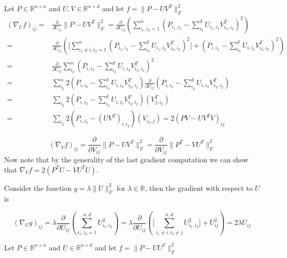 \documentclass{report}
\begin{document}
   Let $ P \in \mathbb{R}^{n \times n} $ and $ U, V \in \mathbb{R}^{n \times d} $ and let $ f = \|P - UV^T\|_F^2 $
   \begin{align*}
     (\nabla_U f)_{ij} =& \frac{\partial}{\partial U_{ij}}\|P - UV^T\|_F^2 = 
     \frac{\partial}{\partial U_{ij}} (\displaystyle \sum_{i_1,i_2 =1}^n(P_{i_1,i_2} 
                     - \displaystyle\sum_{i_3}^d U_{i_1,i_3}V^T_{i_3,i_2})^2)  \\
       =& \frac{\partial}{\partial U_{ij}} (\lbrack \displaystyle \sum_{i_1 \neq i,i_2 =1}^n(P_{i_1,i_2} 
       - \displaystyle\sum_{i_3}^d U_{i_1,i_3}V^T_{i_3,i_2})^2 \rbrack + (P_{i,i_2} 
       - \displaystyle\sum_{i_3}^d U_{i,i_3}V^T_{i_3,i_2})^2)\\
       =& \frac{\partial}{\partial U_{ij}}\displaystyle\sum_{i_2}^n(P_{i,i_2} 
       - \displaystyle\sum_{i_3}^d U_{i,i_3}V^T_{i_3,i_2})^2 \\
       =& \displaystyle\sum_{i_2}^n2(P_{i,i_2} 
       - \displaystyle\sum_{i_3}^d U_{i,i_3}V^T_{i_3,i_2})\frac{\partial}{\partial U_{ij}}(P_{i,i_2} 
       - \displaystyle\sum_{i_3}^d U_{i,i_3}V^T_{i_3,i_2}) \\
       =& \displaystyle\sum_{i_2} 2(P_{i,i_2} 
       - \displaystyle\sum_{i_3}^d U_{i,i_3}V^T_{i_3,i_2})(V^T_{j,i_2}) \\
       =& \displaystyle\sum_{i_2} 2(P_{i,i_2} 
       - (UV^T)_{i,i_2})(V_{i_2,j}) = 2(PV - UV^TV)_{ij}
   \end{align*}
 
  \[
    (\nabla_Vf)_{ij} 
    = \frac{\partial}{\partial V_{ij}}\|P - UV^T\|^2_F = \frac{\partial}{\partial V_{ij}}\|P^T - VU^T\|^2_F
  \]
   	Now note that by the generality of the last gradient computation we can show that $ \nabla_Vf = 2(P^TU - VU^TU) $.
   	
   	Consider the function $ g = \lambda\|U\|_F^2 $ for $ \lambda \in \mathbb{R} $, then the gradient with respect to $ U $ is 
   	
   	\[ 
   	 (\nabla_{U}g)_{ij} 
   	   = \lambda
   	     \frac{\partial}{\partial U_{ij}}(\sum_{i_1,i_2 = 1}^{n,d}U^2_{i_1,i_2})
   	   = \lambda \frac{\partial}{\partial U_{ij}}
   	     (\lbrack \sum_{i_1 \neq i,i_2 \neq j}^{n,d}U^2_{i_1,i_2}\rbrack + U_{ij}^2) = 2\lambda U_{ij}
   	\]
   	
   	
   	\newpage 
   	Let $ P \in \mathbb{R}^{n \times n} $ and $ U \in \mathbb{R}^{n \times d} $ and let $ f = \|P - UU^T\|^2_{F} $
   	
\end{document}
